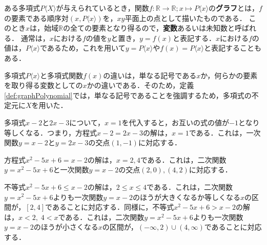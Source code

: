 \begin{definition}[多項式関数のグラフ]
	\label{def:graphPolynomial}%
	ある多項式$P\langle X\rangle$が与えられているとき，関数$f : \mathbb{R} \rightarrow \mathbb{R}; x \mapsto P\langle x\rangle$の\textbf{グラフ}とは，$f$の要素である順序対$(x, P\langle x\rangle)$を，$xy$平面上の点として描いたものである．
	このとき$x$は，始域$\mathbb{R}$の全ての要素となり得るので，\textbf{変数}あるいは未知数と呼ばれる．
	通常は，$x$における$f$の値を$y$と置き，$y = f(x)$と表記する．$x$における$f$の値は，$P\langle x\rangle$であるため，これを用いて$y = P\langle x\rangle$や$f(x) = P\langle x\rangle$と表記することもある．
\end{definition}
\begin{rem*}
	多項式$P\langle x\rangle$と多項式関数$f(x)$の違いは，単なる記号である$x$か，何らかの要素を取り得る変数としての$x$かの違いである．そのため，定義\ref{def:graphPolynomial}では，単なる記号であることを強調するため，多項式の不定元に$X$を用いた．
\end{rem*}

\begin{example*}
	多項式$x-2$と$2x-3$について，$x = 1$を代入すると，お互いの式の値が$-1$となり等しくなる．つまり，方程式$x-2 = 2x-3$の解は，$x = 1$である\footnotemark[3]．これは，一次関数$y = x-2$と$y = 2x-3$の交点$(1, -1)$に対応する．
\end{example*}
\begin{example*}
	方程式$x^2-5x+6 = x-2$の解は，$x = 2, 4$である\footnotemark[3]．これは，二次関数$y = x^2-5x+6$と一次関数$y = x-2$の交点$(2, 0), (4, 2)$に対応する．
\end{example*}
\begin{example*}
	不等式$x^2-5x+6 \leq x-2$の解は，$2 \leq x \leq 4$である．これは，二次関数$y = x^2-5x+6$よりも一次関数$y = x-2$のほうが大きくなるか等しくなる$x$の区間が，$\left[2, 4\right]$であることに対応する．同様に，不等式$x^2-5x+6 > x-2$の解は，$x < 2,\; 4 < x$である．これは，二次関数$y = x^2-5x+6$よりも一次関数$y = x-2$のほうが小さくなる$x$の区間が，$\left(-\infty, 2\right) \cup \left(4, \infty\right)$であることに対応する．
\end{example*}


